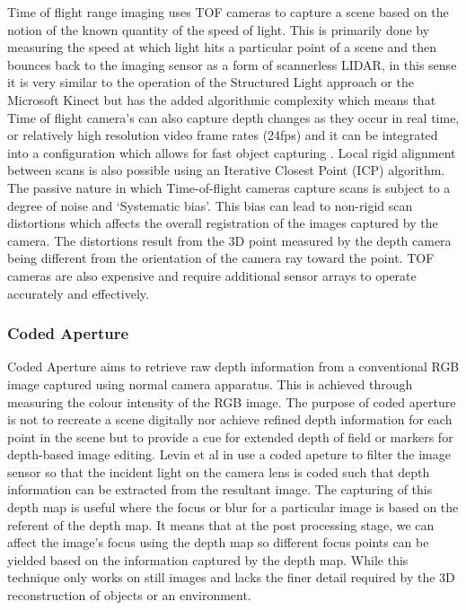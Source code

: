 Time of flight range imaging uses TOF cameras to capture a scene based on the notion of the known quantity of the speed of light. This is primarily done by measuring the speed at which light hits a particular point of a scene and then bounces back to the imaging sensor as a form of scannerless LIDAR, in this sense it is very similar to the operation of the Structured Light approach or the Microsoft Kinect but has the added algorithmic complexity which means that Time of flight camera's can also capture depth changes as they occur in real time, or relatively high resolution video frame rates (24fps) and it can be integrated into a configuration which allows for fast object capturing \cite{Cui2010}. Local rigid alignment between scans  is also possible using an Iterative Closest Point (ICP) algorithm. The passive nature in which Time-of-flight cameras capture scans is subject to a degree of noise and `Systematic bias'. This bias can lead to non-rigid scan distortions which affects the overall registration of the images captured by the camera. The distortions result from the 3D point measured by the depth camera being different from the orientation of the camera ray toward the point. TOF cameras are also expensive and require additional sensor arrays to operate accurately and effectively. 

\subsubsection{Coded Aperture}

Coded Aperture aims to retrieve raw depth information from a conventional RGB image captured using normal camera apparatus. This is achieved through measuring the colour intensity of the RGB image. The purpose of coded aperture is not to recreate a scene digitally nor achieve refined depth information for each point in the scene but to provide a cue for extended depth of field or markers for depth-based image editing. Levin et al in use a coded apeture to filter the image sensor so that the incident light on the camera lens is coded such that depth information can be extracted from the resultant image. The capturing of this depth map is useful where the focus or blur for a particular image is based on the referent of the depth map. It means that at the post processing stage, we can affect the image's focus using the depth map so different focus points can be yielded based on the information captured by the depth map. While this technique only works on still images and lacks the finer detail required by the 3D reconstruction of objects or an environment. 

